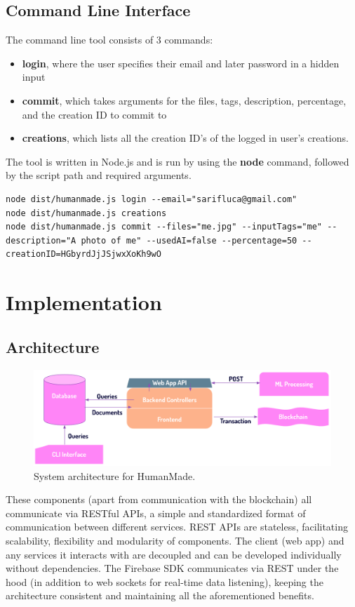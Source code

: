 \documentclass[12pt,a4paper]{article}
\begin{document}
\subsection{Command Line Interface}
The command line tool consists of 3 commands:
\begin{itemize}
    \item \textbf{login}, where the user specifies their email and later password in a hidden input
    \item \textbf{commit}, which takes arguments for the files, tags, description, percentage, and the creation ID to commit to
    \item \textbf{creations}, which lists all the creation ID's of the logged in user's creations.
\end{itemize}
The tool is written in Node.js and is run by using the \textbf{node} command, followed by the script path and required arguments.
\begin{lstlisting}
node dist/humanmade.js login --email="sarifluca@gmail.com"
node dist/humanmade.js creations
node dist/humanmade.js commit --files="me.jpg" --inputTags="me" --description="A photo of me" --usedAI=false --percentage=50 --creationID=HGbyrdJjJSjwxXoKh9wO
\end{lstlisting}
\section{Implementation}
\subsection{Architecture}
\begin{figure}[H]
    \centering
    \includegraphics[scale=0.6]{architecture.png}
    \caption{System architecture for HumanMade. \cite{gpt4}}
\end{figure}
These components (apart from communication with the blockchain) all communicate via RESTful APIs, a simple and standardized format of communication between different services. REST APIs are stateless, facilitating scalability, flexibility and modularity of components. The client (web app) and any services it interacts with are decoupled and can be developed individually without dependencies. The Firebase SDK communicates via REST under the hood (in addition to web sockets for real-time data listening), keeping the architecture consistent and maintaining all the aforementioned benefits.
\end{document}
